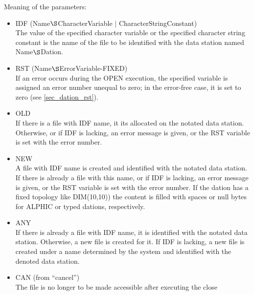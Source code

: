 

Meaning of the parameters:
\begin{itemize}
\item IDF (Name$\S $CharacterVariable $\mid$ CharacterStringConstant)
\\
The value of the specified character variable or the specified character
string constant is the name of the file to be identified with the data
station named Name$\S $Dation.
\item RST (Name$\S $ErrorVariable-FIXED)
\\
If an error occurs during the OPEN execution, the specified variable is
assigned an error number unequal to zero; in the error-free case, it is
set to zero (see \ref{sec_dation_rst}).
\item OLD\\
If there is a file with IDF name, it its allocated on the notated data
station. Otherwise, or if IDF is lacking, an error message is given, or
the RST variable is set with the error number.
\item NEW\\
A file with IDF name is created and identified with the notated data
station. If there is already a file with this name, or if IDF is
lacking, an error message is given, or the RST variable is set with the
error number.
If the dation has a fixed topology like DIM(10,10)) the content is
filled with spaces or null bytes for ALPHIC or typed dations, respectively.
\item ANY\\
If there is already a file with IDF name, it is identified with the
notated data station. Otherwise, a new file is created for it. If IDF
is lacking, a new file is created under a name determined by the system
and identified with the denoted data station.
\item CAN (from ``cancel'')\\
The file is no longer to be made accessible after executing the close

\end{itemize}

